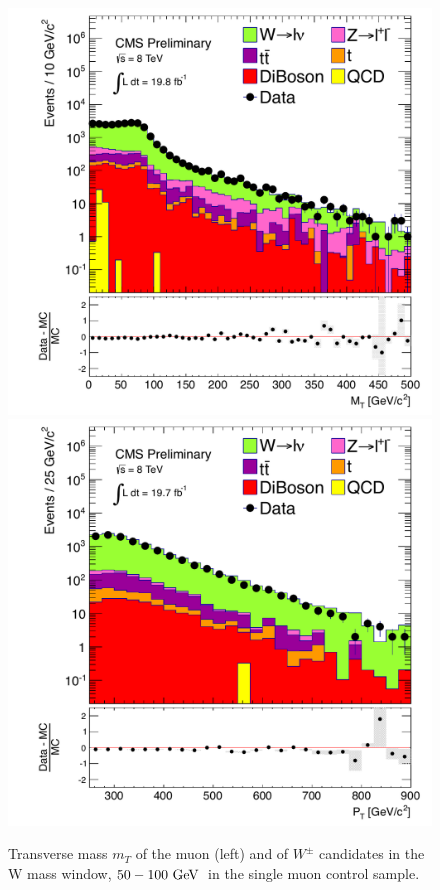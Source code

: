 \begin{figure}[!Hhtb]
  \begin{center}
  \includegraphics[scale=0.39]{Figures/sus13009/cut/WlepnuMT_prelim.pdf}
  \includegraphics[scale=0.39]{Figures/sus13009/cut/WlepnuPT2_50_100_prelim.pdf}
  \caption{Transverse mass $m_{T}$ of the muon (left) and \pt of $W^\pm$ candidates in the W mass window, $50 - 100~\mathrm{GeV}\,$ in the single muon control sample.}
  \label{fig:BKGR_W_mass}
  \end{center}
\end{figure}

